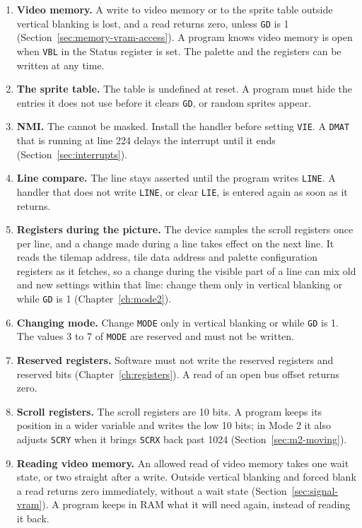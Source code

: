 \begin{enumerate}
	\item \textbf{Video memory.} A write to video memory or to the sprite table outside vertical blanking is lost, and a
	      read returns zero, unless \texttt{GD} is 1 (Section~\ref{sec:memory-vram-access}). A program knows video memory is open when \texttt{VBL} in the
	      Status register is set. The palette and the registers can be written at any time.
	\item \textbf{The sprite table.} The table is undefined at reset. A program must hide the entries it does not use before
	      it clears \texttt{GD}, or random sprites appear.
	\item \textbf{NMI.} The  cannot be masked. Install the handler before setting \texttt{VIE}. A
	      \texttt{DMAT} that is running at line 224 delays the interrupt until it ends (Section~\ref{sec:interrupts}).
	\item \textbf{Line compare.} The  line stays asserted until the program writes \texttt{LINE}. A handler
	      that does not write \texttt{LINE}, or clear \texttt{LIE}, is entered again as soon as it returns.
	\item \textbf{Registers during the picture.} The device samples the scroll registers once per line, and a change made during a line takes effect on the next line. It reads the tilemap address, tile data address and palette configuration registers as it fetches, so a change during the visible part of a line can mix old and new settings within that line: change them only in vertical blanking or while \texttt{GD} is 1 (Chapter~\ref{ch:mode2}).
	\item \textbf{Changing mode.} Change \texttt{MODE} only in vertical blanking or while \texttt{GD} is 1. The values 3 to 7
	      of \texttt{MODE} are reserved and must not be written.
	\item \textbf{Reserved registers.} Software must not write the reserved registers and reserved bits
	      (Chapter~\ref{ch:registers}). A read of an open bus offset returns zero.
	\item \textbf{Scroll registers.} The scroll registers are 10 bits. A program keeps its position in a wider variable and
	      writes the low 10 bits; in Mode 2 it also adjusts \texttt{SCRY} when it brings \texttt{SCRX} back past 1024
	      (Section~\ref{sec:m2-moving}).
	\item \textbf{Reading video memory.} An allowed read of video memory takes one wait state, or two straight after a write. Outside vertical blanking and forced blank a read returns zero immediately, without a wait state (Section~\ref{sec:signal-vram}). A program keeps in RAM what it will need again, instead of reading it back.

\end{enumerate}
